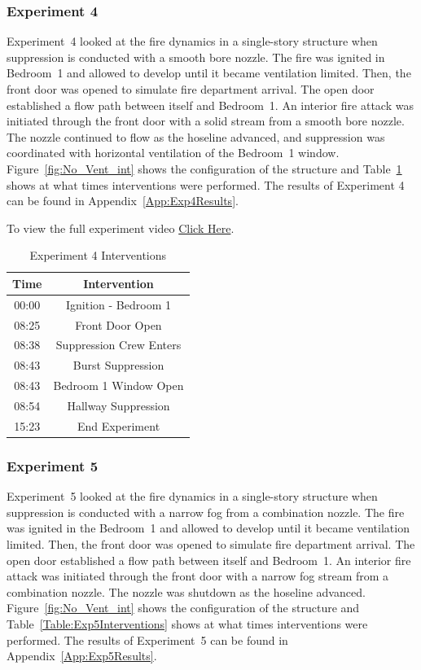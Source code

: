\documentclass[12pt,oneside]{book}
\begin{document}
\FloatBarrier

\subsubsection{Experiment 4}
Experiment~4 looked at the fire dynamics in a single-story structure when suppression is conducted with a smooth bore nozzle. The fire was ignited in Bedroom~1 and allowed to develop until it became ventilation limited. Then, the front door was opened to simulate fire department arrival. The open door established a flow path between itself and Bedroom~1. An interior fire attack was initiated through the front door with a solid stream from a smooth bore nozzle. The nozzle continued to flow as the hoseline advanced, and suppression was coordinated with horizontal ventilation of the Bedroom~1 window. Figure~\ref{fig:No_Vent_int} shows the configuration of the structure and Table~\ref{Table:Exp4Interventions} shows at what times interventions were performed. The results of Experiment 4 can be found in Appendix~\ref{App:Exp4Results}. 

To view the full experiment video \href{https://player.vimeo.com/video/170499609?autoplay=1}{Click Here}.

\begin{table}[!ht]
	\centering
	\caption{Experiment 4 Interventions}
	\begin{tabular}{|c|c|} 
		\hline
		Time & Intervention \\ \hline \hline
		00:00 & Ignition - Bedroom 1 \\ \hline
		08:25 & Front Door Open \\ \hline
		08:38 & Suppression Crew Enters\\ \hline
		08:43 & Burst Suppression \\ \hline
		08:43 & Bedroom 1 Window Open \\ \hline 
		08:54 & Hallway Suppression \\ \hline
		15:23 & End Experiment\\ \hline
	\end{tabular}
	\label{Table:Exp4Interventions}
\end{table}

\FloatBarrier

\subsubsection{Experiment 5}
Experiment~5 looked at the fire dynamics in a single-story structure when suppression is conducted with a narrow fog from a combination nozzle. The fire was ignited in the Bedroom~1 and allowed to develop until it became ventilation limited. Then, the front door was opened to simulate fire department arrival. The open door established a flow path between itself and Bedroom~1. An interior fire attack was initiated through the front door with a narrow fog stream from a combination nozzle. The nozzle was shutdown as the hoseline advanced. Figure~\ref{fig:No_Vent_int} shows the configuration of the structure and Table~\ref{Table:Exp5Interventions} shows at what times interventions were performed. The results of Experiment~5 can be found in Appendix~\ref{App:Exp5Results}. 
\end{document}
